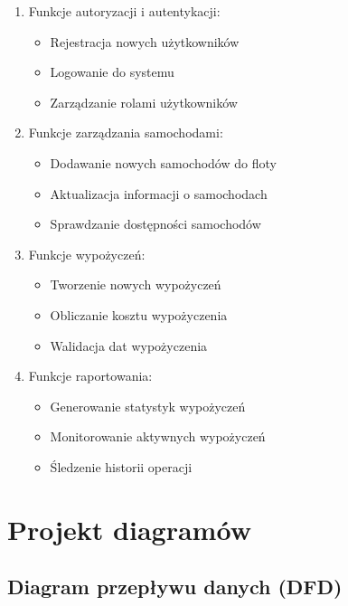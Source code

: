 \documentclass[12pt]{article}
\begin{document}
\begin{enumerate}
    \item Funkcje autoryzacji i autentykacji:
    \begin{itemize}
        \item Rejestracja nowych użytkowników
        \item Logowanie do systemu
        \item Zarządzanie rolami użytkowników
    \end{itemize}
    
    \item Funkcje zarządzania samochodami:
    \begin{itemize}
        \item Dodawanie nowych samochodów do floty
        \item Aktualizacja informacji o samochodach
        \item Sprawdzanie dostępności samochodów
    \end{itemize}
    
    \item Funkcje wypożyczeń:
    \begin{itemize}
        \item Tworzenie nowych wypożyczeń
        \item Obliczanie kosztu wypożyczenia
        \item Walidacja dat wypożyczenia
    \end{itemize}
    
    \item Funkcje raportowania:
    \begin{itemize}
        \item Generowanie statystyk wypożyczeń
        \item Monitorowanie aktywnych wypożyczeń
        \item Śledzenie historii operacji
    \end{itemize}
\end{enumerate}

\section{Projekt diagramów}

\subsection{Diagram przepływu danych (DFD)}
\end{document}
